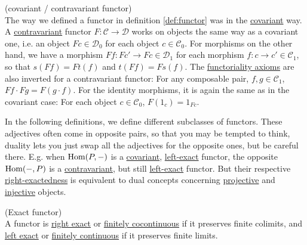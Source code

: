 \begin{definition}{(covariant / contravariant functor)}\\
The way we defined a functor in definition \ref{def:functor} was in the \ul{covariant} way.\\
A \ul{contravariant} functor $F : \mathcal{C} \rightarrow \mathcal{D}$ works on objects the same way as a covariant one, i.e.
an object $Fc \in \mathcal{D}_{0}$ for each object $c \in \mathcal{C}_{0}$. For morphisms on the other hand, we have
a morphism $F f : Fc' \rightarrow Fc \in \mathcal{D}_{1}$ for each morphism $f : c \rightarrow c' \in \mathcal{C}_{1}$, so that
$s(F f) = F t(f)$ and $t(F f) = F s(f)$.
The \ul{functoriality axioms} are also inverted for a contravariant functor:
For any composable pair, $f, g \in \mathcal{C}_{1}$, $F f \cdot F g = F(g \cdot f)$.
For the identity morphisms, it is again the same as in the covariant case:
For each object $c \in \mathcal{C}_{0}$, $F(1_{c}) = 1_{Fc}$.
\end{definition}

In the following definitions, we define different subclasses of functors. These adjectives often come in opposite pairs, so that you may be
tempted to think, duality lets you just swap all the adjectives for the opposite ones, but be careful there. E.g. when 
$\textup{Hom}(P,-)$ is a \ul{covariant}, \ul{left-exact} functor, the opposite $\textup{Hom}(-,P)$ is a \ul{contravariant}, but still \ul{left-exact} functor.
But their respective \ul{right-exactedness} is equivalent to dual concepts concerning \ul{projective} and \ul{injective} objects.

\begin{definition}{(Exact functor)}\label{def:exact_functor}\\
A functor is \ul{right exact} or \ul{finitely cocontinuous} if it preserves finite colimits, and \ul{left exact} or \ul{finitely continuous} if it preserves finite limits.
\end{definition}

